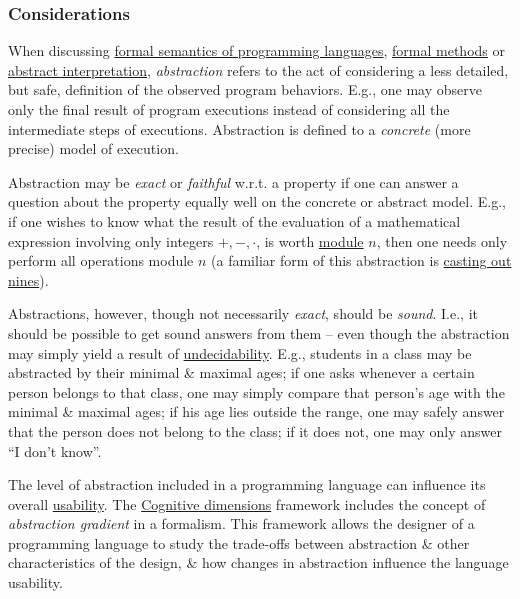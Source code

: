 \documentclass{article}
\begin{document}
\subsubsection{Considerations}
When discussing \href{https://en.wikipedia.org/wiki/Formal_semantics_of_programming_languages}{formal semantics of programming languages}, \href{https://en.wikipedia.org/wiki/Formal_methods}{formal methods} or \href{https://en.wikipedia.org/wiki/Abstract_interpretation}{abstract interpretation}, {\it abstraction} refers to the act of considering a less detailed, but safe, definition of the observed program behaviors. E.g., one may observe only the final result of program executions instead of considering all the intermediate steps of executions. Abstraction is defined to a {\it concrete} (more precise) model of execution.

Abstraction may be {\it exact} or {\it faithful} w.r.t. a property if one can answer a question about the property equally well on the concrete or abstract model. E.g., if one wishes to know what the result of the evaluation of a mathematical expression involving only integers $+,-,\cdot$, is worth \href{https://en.wikipedia.org/wiki/Modular_arithmetic}{module} $n$, then one needs only perform all operations module $n$ (a familiar form of this abstraction is \href{https://en.wikipedia.org/wiki/Casting_out_nines}{casting out nines}).

Abstractions, however, though not necessarily {\it exact}, should be {\it sound}. I.e., it should be possible to get sound answers from them -- even though the abstraction may simply yield a result of \href{https://en.wikipedia.org/wiki/Undecidable_problem}{undecidability}. E.g., students in a class may be abstracted by their minimal \& maximal ages; if one asks whenever a certain person belongs to that class, one may simply compare that person's age with the minimal \& maximal ages; if his age lies outside the range, one may safely answer that the person does not belong to the class; if it does not, one may only answer ``I don't know''.

The level of abstraction included in a programming language can influence its overall \href{https://en.wikipedia.org/wiki/Usability}{usability}. The \href{https://en.wikipedia.org/wiki/Cognitive_dimensions}{Cognitive dimensions} framework includes the concept of {\it abstraction gradient} in a formalism. This framework allows the designer of a programming language to study the trade-offs between abstraction \& other characteristics of the design, \& how changes in abstraction influence the language usability.
\end{document}
